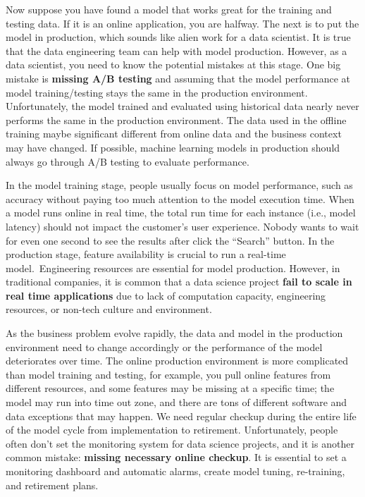 \documentclass[12pt,]{krantz}
\theoremstyle{definition}
\theoremstyle{definition}
\theoremstyle{definition}
\theoremstyle{remark}
\begin{document}
Now suppose you have found a model that works great for the training and
testing data. If it is an online application, you are halfway. The next
is to put the model in production, which sounds like alien work for a
data scientist. It is true that the data engineering team can help with
model production. However, as a data scientist, you need to know the
potential mistakes at this stage. One big mistake is \textbf{missing A/B
testing} and assuming that the model performance at model
training/testing stays the same in the production environment.
Unfortunately, the model trained and evaluated using historical data
nearly never performs the same in the production environment. The data
used in the offline training maybe significant different from online
data and the business context may have changed. If possible, machine
learning models in production should always go through A/B testing to
evaluate performance.

In the model training stage, people usually focus on model performance,
such as accuracy without paying too much attention to the model
execution time. When a model runs online in real time, the total run
time for each instance (i.e., model latency) should not impact the
customer's user experience. Nobody wants to wait for even one second to
see the results after click the ``Search'' button. In the production
stage, feature availability is crucial to run a real-time
model.~Engineering resources are essential for model production.
However, in traditional companies, it is common that a data science
project \textbf{fail to scale in real time applications} due to lack of
computation capacity, engineering resources, or non-tech culture and
environment.

As the business problem evolve rapidly, the data and model in the
production environment need to change accordingly or the performance of
the model deteriorates over time. The online production environment is
more complicated than model training and testing, for example, you pull
online features from different resources, and some features may be
missing at a specific time; the model may run into time out zone, and
there are tons of different software and data exceptions that may
happen. We need regular checkup during the entire life of the model
cycle from implementation to retirement. Unfortunately, people often
don't set the monitoring system for data science projects, and it is
another common mistake: \textbf{missing necessary online checkup}. It is
essential to set a monitoring dashboard and automatic alarms, create
model tuning, re-training, and retirement plans.
\end{document}
